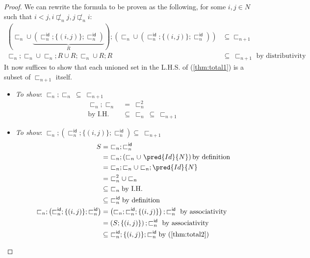 \begin{lem}
{\begin{proof}
	We can rewrite the formula to be proven as the following, for some $i, j \in N$ such that $i < j, i \not\sqsubset_n j, j \not\sqsubset_n i$:
	\begin{align}
		\left( \sqsubset_n \cup \underbrace{\left( \sqsubset_n^\mathsf{id} ; \{ (i, j) \} ; \sqsubset_n^\mathsf{id} \right)}_{R} \right) ; \left( \sqsubset_n \cup \left( \sqsubset_n^\mathsf{id} ; \{ (i, j) \} ; \sqsubset_n^\mathsf{id} \right) \right) &\subseteq \sqsubset_{n + 1} \\
		\label{thm:total1} \sqsubset_n ; \sqsubset_n \cup \sqsubset_n ; R \cup R ; \sqsubset_n \cup R ; R &\subseteq\ \sqsubset_{n + 1} \text{ by distributivity}
	\end{align}
	It now suffices to show that each unioned set in the L.H.S. of (\ref{thm:total1}) is a subset of $\sqsubset_{n + 1}$ itself.
	\begin{itemize}
		\item \textit{To show}: $\sqsubset_n ; \sqsubset_n\ \subseteq\ \sqsubset_{n + 1}$
			\begin{align}
				\sqsubset_n ; \sqsubset_n\ &=\ \sqsubset_n^2 \\
				\text{by I.H.}&\subseteq\ \sqsubset_n\ \subseteq\ \sqsubset_{n + 1}
			\end{align}
		\item \textit{To show}: $\sqsubset_n ; \left( \sqsubset_n^\mathsf{id} ; \{ (i, j) \} ; \sqsubset_n^\mathsf{id} \right) \subseteq\ \sqsubset_{n + 1}$
			\begin{align}
				S  &=\ \sqsubset_n ; \sqsubset_n^\mathsf{id} \\
					&=\ \sqsubset_n ; \left( \sqsubset_n \cup\ \pred{Id}{N} \right) \text{by definition} \\
					&=\ \sqsubset_n ; \sqsubset_n \cup \sqsubset_n ; \pred{Id}{N} \\
					&=\ \sqsubset_n^2 \cup \sqsubset_n \\
					&\subseteq\ \sqsubset_n \text{by I.H.} \\
					\label{thm:total2} &\subseteq\ \sqsubset_n^\mathsf{id} \text{by definition} \\
				\sqsubset_n ; \left( \sqsubset_n^\mathsf{id} ; \{ (i, j) \} ; \sqsubset_n^\mathsf{id} \right) &= \left( \sqsubset_n ; \sqsubset_n^\mathsf{id} ; \{ (i, j) \} \right) ; \sqsubset_n^\mathsf{id} \text{ by associativity} \\
				&= \left( S ; \{ (i, j) \} \right) ; \sqsubset_n^\mathsf{id} \text{ by associativity} \\
				&\subseteq\ \sqsubset_n^\mathsf{id} ; \{ (i, j) \} ; \sqsubset_n^\mathsf{id} \text{by (\ref{thm:total2})} \\

\end{align}
\end{itemize}
\end{proof}}
\end{lem}
